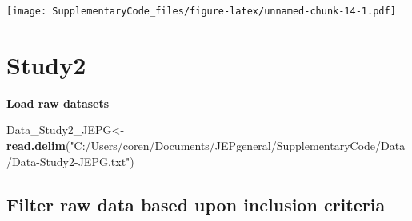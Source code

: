 \documentclass[
]{book}
\newenvironment{Shaded}{\begin{snugshade}}{\end{snugshade}}
\newcommand{\KeywordTok}[1]{\textcolor[rgb]{0.13,0.29,0.53}{\textbf{#1}}}
\newcommand{\NormalTok}[1]{#1}
\newcommand{\StringTok}[1]{\textcolor[rgb]{0.31,0.60,0.02}{#1}}
\begin{document}
\texttt{[image: SupplementaryCode\_files/figure-latex/unnamed-chunk-14-1.pdf]}

\hypertarget{study2}{%
\chapter{Study2}\label{study2}}

\textbf{Load raw datasets}

\begin{Shaded}
\begin{Highlighting}[]
\NormalTok{Data_Study2_JEPG<-}\KeywordTok{read.delim}\NormalTok{(}\StringTok{"C:/Users/coren/Documents/JEPgeneral/SupplementaryCode/Data/Data-Study2-JEPG.txt"}\NormalTok{)}
\end{Highlighting}
\end{Shaded}

\hypertarget{filter-raw-data-based-upon-inclusion-criteria}{%
\section{Filter raw data based upon inclusion criteria}\label{filter-raw-data-based-upon-inclusion-criteria}}
\end{document}
